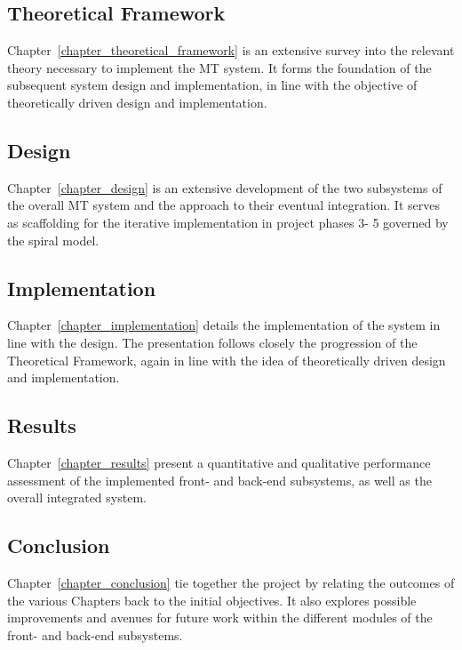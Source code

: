 \subsection{Theoretical Framework}
Chapter~\ref{chapter_theoretical_framework} is an
extensive survey into the relevant theory necessary to implement the
MT system. It forms the foundation of the subsequent system design and
implementation, in line with the objective of theoretically driven design and
implementation. 

\subsection{Design}
Chapter~\ref{chapter_design} is an extensive development of the
two subsystems of the overall MT system and the approach to their eventual
integration. It serves as scaffolding for the iterative implementation in project
phases 3- 5 governed by the spiral model.

\subsection{Implementation}
Chapter~\ref{chapter_implementation} details the
implementation of the system in line with the design. The presentation follows
closely the progression of the Theoretical Framework, again in line with the
idea of theoretically driven design and implementation.

\subsection{Results}
Chapter~\ref{chapter_results} present a quantitative and
qualitative performance assessment of the implemented front- and back-end
subsystems, as well as the overall integrated system. 

\subsection{Conclusion}
Chapter~\ref{chapter_conclusion} tie together the project by
relating the outcomes of the various Chapters back to the initial objectives. 
It also explores possible improvements and avenues for future work within the
different modules of the front- and back-end subsystems.


